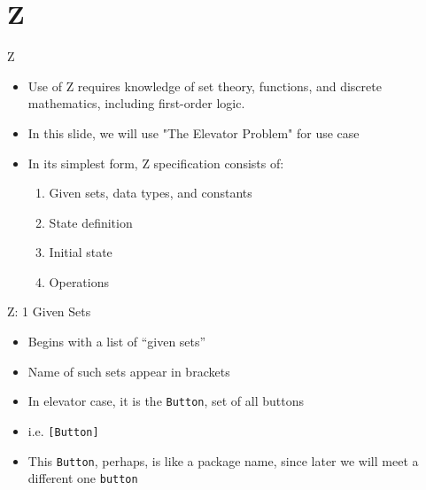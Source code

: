 \documentclass{beamer}
\begin{document}
	\section{Z}
	\begin{frame}{Z}
    	\begin{itemize}
            \item Use of Z \cite{Spivey:1989:ZNR:61690} requires knowledge of set theory, functions, and discrete mathematics, including first-order logic.
            \item In this slide, we will use "The Elevator Problem" \cite[page 378]{Schach:2006:OCS:1207045} for use case
            \item In its simplest form, Z specification consists of:
            \begin{enumerate}
                \item Given sets, data types, and constants
                \item State definition
                \item Initial state
                \item Operations
            \end{enumerate}
	    \end{itemize}
	\end{frame}
	\begin{frame}{Z: 1 Given Sets}
    	\begin{itemize}
            \item Begins with a list of ``given sets''
            \item Name of such sets appear in brackets
            \item In elevator case, it is the \texttt{Button}, set of all buttons
            \item i.e. \texttt{[Button]}
            \item This \texttt{Button}, perhaps, is like a package name, since later we will meet a different one \texttt{button}
	    \end{itemize}
	\end{frame}
\end{document}
